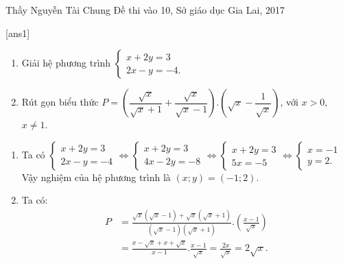 \begin{name}
{Thầy  Nguyễn Tài Chung}
{Đề thi vào 10, Sở giáo dục Gia Lai, 2017}
\end{name}
\setcounter{ex}{0}
[ans1]
\begin{ex}%
    \hfill
    \begin{enumerate}
        \item Giải hệ phương trình 
        $\begin{cases}
        x + 2y = 3\\2x - y =  - 4.
        \end{cases}$
        \item Rút gọn biểu thức $P=\left( \dfrac{\sqrt x}{\sqrt{x}+1}+\dfrac{\sqrt x}{\sqrt{x}-1} \right).\left( \sqrt{x}-\dfrac{1}{\sqrt{x}} \right)$, với $x>0$, $x\ne 1$.
    \end{enumerate}
\loigiai
    {
    \begin{enumerate}
        \item Ta có
        $\begin{cases}x + 2y = 3\\2x - y =  - 4
        \end{cases}
        \Leftrightarrow  \begin{cases}x + 2y = 3\\4x - 2y = -8\end{cases}
        \Leftrightarrow  \begin{cases}x + 2y = 3\\5x=  -5\end{cases}
        \Leftrightarrow  \begin{cases}x=-1\\y= 2.\end{cases}$\\
        Vậy nghiệm của hệ phương trình là $(x;y)=(-1;2)$.
        \item Ta có:
       {\allowdisplaybreaks
       	\begin{align*}
       P&=\frac{\sqrt{x}\left( \sqrt{x}-1 \right)+\sqrt{x}\left( \sqrt{x}+1 \right)}{\left( \sqrt{x}-1 \right)\left( \sqrt{x}+1 \right)}.\left( \frac{x-1}{\sqrt{x}} \right)\\
       	&=\frac{x-\sqrt{x}+x+\sqrt{x}}{x-1}.\frac{x-1}{\sqrt{x}}
       	=\frac{2x}{\sqrt{x}}
       	=2\sqrt{x}.
       \end{align*}}
    \end{enumerate}
    }
\end{ex}
